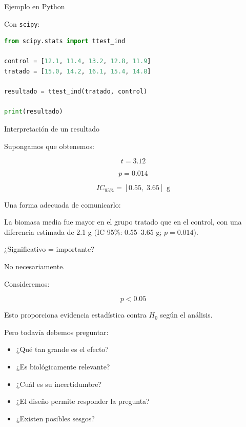 \begin{frame}[fragile]{Ejemplo en Python}

Con \texttt{scipy}:

\begin{lstlisting}[language=Python]
from scipy.stats import ttest_ind

control = [12.1, 11.4, 13.2, 12.8, 11.9]
tratado = [15.0, 14.2, 16.1, 15.4, 14.8]

resultado = ttest_ind(tratado, control)

print(resultado)
\end{lstlisting}

\end{frame}

\begin{frame}{Interpretación de un resultado}

Supongamos que obtenemos:

\[
t=3.12
\]

\[
p=0.014
\]

\[
IC_{95\%}=[0.55,\;3.65]\text{ g}
\]

Una forma adecuada de comunicarlo:

\begin{block}
La biomasa media fue mayor en el grupo tratado que en el control,
con una diferencia estimada de 2.1 g (IC 95\%: 0.55--3.65 g;
$p=0.014$).
\end{block}

\end{frame}

\begin{frame}{¿Significativo = importante?}

No necesariamente.

Consideremos:

\[
p<0.05
\]

Esto proporciona evidencia estadística contra $H_0$ según el análisis.

Pero todavía debemos preguntar:

\begin{itemize}
    \item ¿Qué tan grande es el efecto?
    \item ¿Es biológicamente relevante?
    \item ¿Cuál es su incertidumbre?
    \item ¿El diseño permite responder la pregunta?
    \item ¿Existen posibles sesgos?
\end{itemize}

\end{frame}

